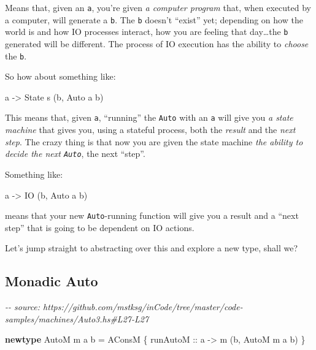 \documentclass[]{article}
\newenvironment{Shaded}{}{}
\newcommand{\CommentTok}[1]{\textcolor[rgb]{0.38,0.63,0.69}{\textit{#1}}}
\newcommand{\DataTypeTok}[1]{\textcolor[rgb]{0.56,0.13,0.00}{#1}}
\newcommand{\KeywordTok}[1]{\textcolor[rgb]{0.00,0.44,0.13}{\textbf{#1}}}
\newcommand{\NormalTok}[1]{#1}
\newcommand{\OtherTok}[1]{\textcolor[rgb]{0.00,0.44,0.13}{#1}}
\begin{document}
Means that, given an \texttt{a}, you're given \emph{a computer program} that,
when executed by a computer, will generate a \texttt{b}. The \texttt{b} doesn't
``exist'' yet; depending on how the world is and how IO processes interact, how
you are feeling that day\ldots the \texttt{b} generated will be different. The
process of IO execution has the ability to \emph{choose} the \texttt{b}.

So how about something like:

\begin{Shaded}
\begin{Highlighting}[]
\NormalTok{a }\OtherTok{{-}\textgreater{}} \DataTypeTok{State}\NormalTok{ s (b, }\DataTypeTok{Auto}\NormalTok{ a b)}
\end{Highlighting}
\end{Shaded}

This means that, given \texttt{a}, ``running'' the \texttt{Auto} with an
\texttt{a} will give you \emph{a state machine} that gives you, using a stateful
process, both the \emph{result} and the \emph{next step}. The crazy thing is
that now you are given the state machine \emph{the ability to decide the next
\texttt{Auto}}, the next ``step''.

Something like:

\begin{Shaded}
\begin{Highlighting}[]
\NormalTok{a }\OtherTok{{-}\textgreater{}} \DataTypeTok{IO}\NormalTok{ (b, }\DataTypeTok{Auto}\NormalTok{ a b)}
\end{Highlighting}
\end{Shaded}

means that your new \texttt{Auto}-running function will give you a result and a
``next step'' that is going to be dependent on IO actions.

Let's jump straight to abstracting over this and explore a new type, shall we?

\subsection{Monadic Auto}\label{monadic-auto}

\begin{Shaded}
\begin{Highlighting}[]
\CommentTok{{-}{-} source: https://github.com/mstksg/inCode/tree/master/code{-}samples/machines/Auto3.hs\#L27{-}L27}

\KeywordTok{newtype} \DataTypeTok{AutoM}\NormalTok{ m a b }\OtherTok{=} \DataTypeTok{AConsM}\NormalTok{ \{}\OtherTok{ runAutoM ::}\NormalTok{ a }\OtherTok{{-}\textgreater{}}\NormalTok{ m (b, }\DataTypeTok{AutoM}\NormalTok{ m a b) \}}
\end{Highlighting}
\end{Shaded}
\end{document}
